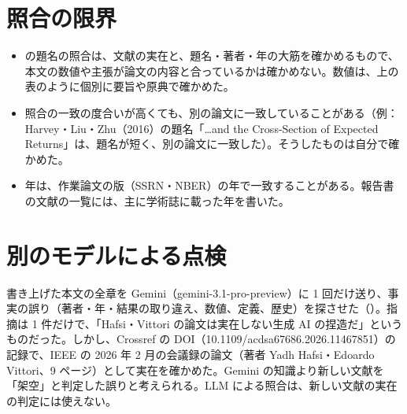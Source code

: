 \section{照合の限界}

\begin{itemize}
\item {} の題名の照合は、文献の実在と、題名・著者・年の大筋を確かめるもので、本文の数値や主張が論文の内容と合っているかは確かめない。数値は、上の表のように個別に要旨や原典で確かめた。
\item 照合の一致の度合いが高くても、別の論文に一致していることがある（例：Harvey・Liu・Zhu（2016）の題名「\ldots and the Cross-Section of Expected Returns」は、題名が短く、別の論文に一致した）。そうしたものは自分で確かめた。
\item 年は、作業論文の版（SSRN・NBER）の年で一致することがある。報告書の文献の一覧には、主に学術誌に載った年を書いた。
\end{itemize}

\section{別のモデルによる点検}
\label{sec:othermodel}

書き上げた本文の全章を Gemini（gemini-3.1-pro-preview）に 1 回だけ送り、事実の誤り（著者・年・結果の取り違え、数値、定義、歴史）を探させた（）。指摘は 1 件だけで、「Hafsi・Vittori の論文は実在しない生成 AI の捏造だ」というものだった。しかし、Crossref の DOI（10.1109/acdsa67686.2026.11467851）の記録で、IEEE の 2026 年 2 月の会議録の論文（著者 Yadh Hafsi・Edoardo Vittori、9 ページ）として実在を確かめた。Gemini の知識より新しい文献を「架空」と判定した誤りと考えられる。LLM による照合は、新しい文献の実在の判定には使えない。

